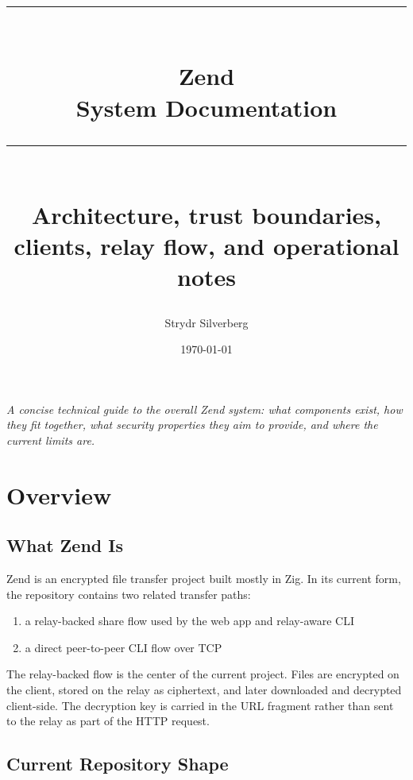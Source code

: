 \documentclass[11pt,a4paper]{report}
\title{%
    \vspace{-1cm}
    \rule{\textwidth}{1pt}\\[0.5cm]
    {\Huge\bfseries Zend}\\[0.3cm]
    {\Large System Documentation}\\[0.3cm]
    \rule{\textwidth}{1pt}\\[1cm]
    {\large Architecture, trust boundaries, clients, relay flow, and operational notes}
}
\author{Strydr Silverberg}
\date{\today}
\begin{document}
\maketitle
\thispagestyle{empty}

\vfill
\begin{center}
    \textit{A concise technical guide to the overall Zend system: what components exist, how they fit together, what security properties they aim to provide, and where the current limits are.}
\end{center}
\vfill

\newpage
\tableofcontents
\newpage

\chapter{Overview}

\section{What Zend Is}

Zend is an encrypted file transfer project built mostly in Zig. In its current form, the repository contains two related transfer paths:

\begin{enumerate}
    \item a relay-backed share flow used by the web app and relay-aware CLI
    \item a direct peer-to-peer CLI flow over TCP
\end{enumerate}

The relay-backed flow is the center of the current project. Files are encrypted on the client, stored on the relay as ciphertext, and later downloaded and decrypted client-side. The decryption key is carried in the URL fragment rather than sent to the relay as part of the HTTP request.

\section{Current Repository Shape}
\end{document}
